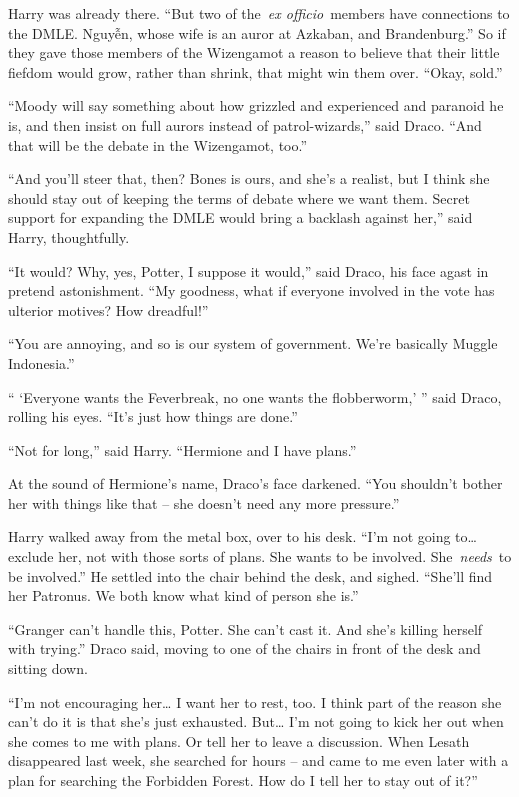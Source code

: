 Harry was already there. ``But two of the~\emph{ex officio}~members have
connections to the DMLE. Nguyễn, whose wife is an auror at Azkaban, and
Brandenburg.'' So if they gave those members of the Wizengamot a reason
to believe that their little fiefdom would grow, rather than shrink,
that might win them over. ``Okay, sold.''

``Moody will say something about how grizzled and experienced and
paranoid he is, and then insist on full aurors instead of
patrol-wizards,'' said Draco. ``And that will be the debate in the
Wizengamot, too.''

``And you'll steer that, then? Bones is ours, and she's a realist, but I
think she should stay out of keeping the terms of debate where we want
them. Secret support for expanding the DMLE would bring a backlash
against her,'' said Harry, thoughtfully.

``It would? Why, yes, Potter, I suppose it would,'' said Draco, his face
agast in pretend astonishment. ``My goodness, what if everyone involved
in the vote has ulterior motives? How dreadful!''

``You are annoying, and so is our system of government. We're basically
Muggle Indonesia.''

`` `Everyone wants the Feverbreak, no one wants the flobberworm,' ''
said Draco, rolling his eyes. ``It's just how things are done.''

``Not for long,'' said Harry. ``Hermione and I have plans.''

At the sound of Hermione's name, Draco's face darkened. ``You shouldn't
bother her with things like that -- she doesn't need any more
pressure.''

Harry walked away from the metal box, over to his desk. ``I'm not going
to\ldots{} exclude her, not with those sorts of plans. She wants to be
involved. She~\emph{needs}~to be involved.'' He settled into the chair
behind the desk, and sighed. ``She'll find her Patronus. We both know
what kind of person she is.''

``Granger can't handle this, Potter. She can't cast it. And she's
killing herself with trying.'' Draco said, moving to one of the chairs
in front of the desk and sitting down.

``I'm not encouraging her\ldots{} I want her to rest, too. I think part
of the reason she can't do it is that she's just exhausted. But\ldots{}
I'm not going to kick her out when she comes to me with plans. Or tell
her to leave a discussion. When Lesath disappeared last week, she
searched for hours -- and came to me even later with a plan for
searching the Forbidden Forest. How do I tell her to stay out of it?''

